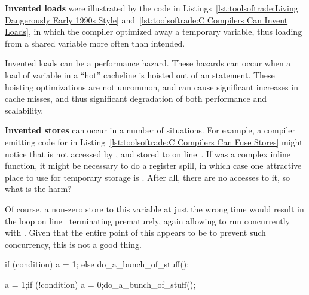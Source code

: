 {\bf Invented loads} were illustrated by the code in
Listings~\ref{lst:toolsoftrade:Living Dangerously Early 1990s Style}
and~\ref{lst:toolsoftrade:C Compilers Can Invent Loads},
in which the compiler optimized away a temporary variable,
thus loading from a shared variable more often than intended.

Invented loads can be a performance hazard.
These hazards can occur when a load of variable in a ``hot''
cacheline is hoisted out of an  statement.
These hoisting optimizations are not uncommon, and can cause significant
increases in cache misses, and thus significant degradation of
both performance and scalability.

\begin{fcvref}
{\bf Invented stores} can occur in a number of situations.
For example, a compiler emitting code for  in
Listing~\ref{lst:toolsoftrade:C Compilers Can Fuse Stores}
might notice that  is not accessed by
, and stored to on line~.
If  was a complex inline function, it might be
necessary to do a register spill, in which case one attractive
place to use for temporary storage is .
After all, there are no accesses to it, so what is the harm?

Of course, a non-zero store to this variable at just the wrong time
would result in the  loop on
line~ terminating
prematurely, again allowing  to run
concurrently with .
Given that the entire point of this  appears to be to
prevent such concurrency, this is not a good thing.
\end{fcvref}

\begin{listing}[tbp]
\begin{fcvlabel}
\begin{VerbatimL}[commandchars=\\\{\}]
if (condition)
	a = 1;
else
	do_a_bunch_of_stuff();
\end{VerbatimL}
\end{fcvlabel}
\caption{Inviting an Invented Store}
\label{lst:toolsoftrade:Inviting an Invented Store}
\end{listing}

\begin{listing}[tbp]
\begin{fcvlabel}
\begin{VerbatimL}[commandchars=\\\[\]]
a = 1;
if (!condition) {
	a = 0;
	do_a_bunch_of_stuff();
}
\end{VerbatimL}
\end{fcvlabel}
\caption{Compiler Invents an Invited Store}
\label{lst:toolsoftrade:Compiler Invents an Invited Store}
\end{listing}


